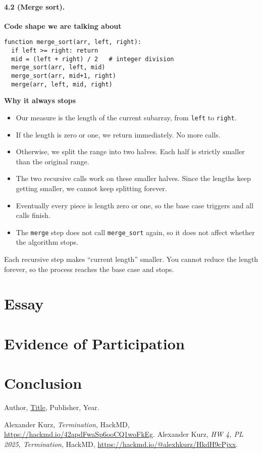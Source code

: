 \documentclass{article}
\theoremstyle{theorem}
\theoremstyle{definition}
\theoremstyle{remark}
\begin{document}
\paragraph{4.2 (Merge sort).}
\textbf{Code shape we are talking about}
\begin{verbatim}
function merge_sort(arr, left, right):
  if left >= right: return
  mid = (left + right) / 2   # integer division
  merge_sort(arr, left, mid)
  merge_sort(arr, mid+1, right)
  merge(arr, left, mid, right)
\end{verbatim}

\textbf{Why it always stops}
\begin{itemize}
  \item Our measure is the length of the current subarray, from \texttt{left} to \texttt{right}.
  \item If the length is zero or one, we return immediately. No more calls.
  \item Otherwise, we split the range into two halves. Each half is strictly smaller than the original range.
  \item The two recursive calls work on these smaller halves. Since the lengths keep getting smaller, we cannot keep splitting forever.
  \item Eventually every piece is length zero or one, so the base case triggers and all calls finish.
  \item The \texttt{merge} step does not call \texttt{merge\_sort} again, so it does not affect whether the algorithm stops.
\end{itemize}
 Each recursive step makes ``current length'' smaller. You cannot reduce the length forever, so the process reaches the base case and stops.
\section{Essay}

\section{Evidence of Participation}

\section{Conclusion}\label{conclusion}

\begin{thebibliography}{99}
 Author, \href{https://en.wikipedia.org/wiki/LaTeX}{Title}, Publisher, Year.

 Alexander Kurz, \emph{Termination}, HackMD, \url{https://hackmd.io/42apdFwaSp6ooCQ1woFkEg}.
 Alexander Kurz, \emph{HW 4, PL 2025, Termination}, HackMD, \url{https://hackmd.io/@alexhkurz/HkdH9cPjxx}.

\end{thebibliography}
\end{document}
